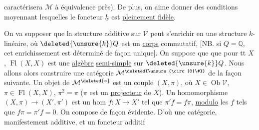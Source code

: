 caractérisera $\mathcal M$ à équivalence près). De plus, on aime donner des conditions moyennant lesquelles le foncteur $\underline h$ est \uline{pleinement fidèle}.

On va supposer que la structure additive sur $\mathscr V$ peut s'enrichir en une structure $k$-linéaire, où $\deleted{\unsure{k}}Q$ est un \uline{corps} commutatif,
[NB. si $Q=\mathbb Q$, cet enrichissement est déterminé de façon unique]. On suppose que  que pour tt $X$, $\operatorname{Fl}(X,X)$ est une \uline{algèbre}  \uline{semi-simple} sur $\deleted{\unsure{k}}Q$. Nous allons alors  construire une catégorie $\mathcal M^{\deleted{\unsure{\circ|0|\#}}}$ de la façon suivante. Un objet de $\mathcal M^{\deleted{\circ}}$ est un couple $(X,\pi)$, où $X\in\operatorname{Ob}\mathscr V$, $\pi\in\operatorname{Fl}(X,X)$, $\pi^2=\pi$ ($\pi$ est un \uline{projecteur} de $X$). Un homomorphisme $(X,\pi)\to(X',\pi')$ est un hom $f:X\to X'$ tel que $\pi'f=f\pi$, \uline{modulo} les $f$ tels que $f\pi=\pi'f=0$.
On compose de façon évidente. D'où une catégorie, manifestement additive, et un foncteur additif
